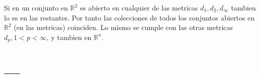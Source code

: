 \documentclass[palatino]{apuntes}
\begin{document}
\begin{obs}
Si en un conjunto en $ ℝ^2 $ es abierto en cualquier de las metricas $ d_1, d_2, d_∞ $ tambien lo es en las restantes. Por tanto las colecciones de todos los conjuntos abiertos en $  ℝ^2 $ (en las metricas) coinciden. Lo mismo se cumple con las otras metricas $ d_p, 1 < p < ∞ $, y tambien en $ ℝ^n $.
\end{obs}













































\appendix

\chapter{---}


\printindex
\end{document}
